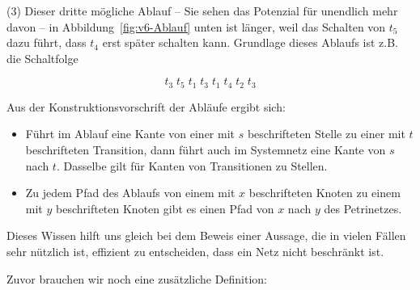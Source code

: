 \vspace{\baselineskip}

(3) Dieser dritte mögliche Ablauf -- Sie sehen das Potenzial für unendlich mehr davon -- in Abbildung~\ref{fig:v6-Ablauf} unten ist länger, weil das Schalten von $t_5$ dazu führt, dass $t_4$ erst später schalten kann. Grundlage dieses Ablaufs ist z.B. die Schaltfolge

$$t_3 \; t_5 \; t_1 \; t_3 \; t_1 \; t_4 \; t_2 \;  t_3 $$

Aus der Konstruktionsvorschrift der Abläufe ergibt sich:
\begin{itemize}
	\item Führt im Ablauf eine Kante von einer mit $s$ beschrifteten Stelle zu einer mit $t$ beschrifteten Transition, dann führt auch im Systemnetz eine Kante von $s$ nach $t$. Dasselbe gilt für Kanten von Transitionen zu Stellen.
	\item Zu jedem Pfad des Ablaufs von einem mit $x$ beschrifteten Knoten zu einem mit $y$ beschrifteten Knoten gibt es einen Pfad von $x$ nach $y$ des Petrinetzes. 
\end{itemize}

Dieses Wissen hilft uns gleich bei dem Beweis einer Aussage, die in vielen Fällen sehr nützlich ist, effizient zu entscheiden, dass ein Netz nicht beschränkt ist.

Zuvor brauchen wir noch eine zusätzliche Definition:



